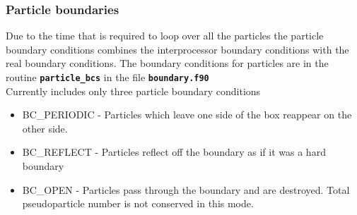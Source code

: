 \documentclass[12pt,a4paper]{article}
\newcommand{\inlinecode}[1]{{\color{warwickred} \bf\texttt{#1}}}
\newcommand{\EPOCH}{{\color{warwickdark}\fontfamily{phv}\selectfont{EPOCH}}}
\begin{document}
\subsubsection{Particle boundaries}
Due to the time that is required to loop over all the particles the particle
boundary conditions {\EPOCH} combines the interprocessor boundary conditions with
the real boundary conditions. The boundary conditions for particles are in the
routine \inlinecode{particle\_bcs} in the file \inlinecode{boundary.f90} \\
Currently {\EPOCH} includes only three particle boundary conditions
\begin{itemize}
\item BC\_PERIODIC - Particles which leave one side of the box reappear on the
  other side.
\item BC\_REFLECT - Particles reflect off the boundary as if it was a hard
  boundary
\item BC\_OPEN - Particles pass through the boundary and are destroyed. Total
  pseudoparticle number is not conserved in this mode.
\end{itemize}
\end{document}
